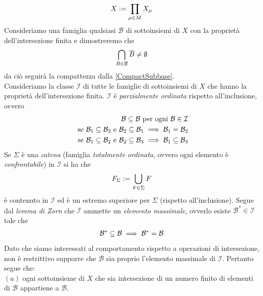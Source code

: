 \documentclass[oneside, 11pt]{amsbook}
\makeatletter
\newcommand{\0}{{(0)}}
\newcommand{\3}{{(3)}}
\theoremstyle{colonplain}
\theoremstyle{colondefinition}
\theoremstyle{colonremark}
\numberwithin{equation}{chapter}
\renewcommand{\proofname}{Dimostrazione}
\renewenvironment{proof}[1][\proofname]{\par
  \pushQED{\qed}%
  \normalfont \topsep6\p@\@plus6\p@\relax
  \trivlist
  \item[\hskip\labelsep\bfseries #1:]\ignorespaces
}{%
  \popQED\endtrivlist\@endpefalse
}
\makeatother
\begin{document}
\begin{proof}
\begin{align}
    X := \prod_{\mu \in M} X_\mu \notag
\end{align}
Consideriamo una famiglia qualsiasi $\mathcal{B}$ di sottoinsiemi di $X$ con la proprietà dell'intersezione finita e dimostreremo che
\begin{align}
    \bigcap_{B \in \mathcal{B}} \overline{B} \neq \emptyset \notag
\end{align}
da ciò seguirà la compattezza dalla \cref{CompactSubbase}. \\
Consideriamo la classe $\mathcal{I}$ di tutte le famiglie di sottoinsiemi di $X$ che hanno la proprietà dell'intersezione finita. $\mathcal{I}$ è \textit{parzialmente ordinata} rispetto all'inclusione, ovvero
\begin{align}
    \mathcal{B} \subseteq \mathcal{B} \text{ per ogni } \mathcal{B} \in \mathcal{I} \notag \\
    \text{ se } \mathcal{B}_1 \subseteq \mathcal{B}_2 \text{ e } \mathcal{B}_2 \subseteq \mathcal{B}_1 \implies \mathcal{B}_1 = \mathcal{B}_2 \notag \\
    \text{ se } \mathcal{B}_1 \subseteq \mathcal{B}_2 \text{ e } \mathcal{B}_2 \subseteq \mathcal{B}_3 \implies \mathcal{B}_1 \subseteq \mathcal{B}_3 \notag
\end{align}
Se $\Sigma$ è una \textit{catena} (famiglia \textit{totalmente ordinata}, ovvero ogni elemento è \textit{confrontabile}) in $\mathcal{I}$ si ha che
\begin{align}
    F_\Sigma := \bigcup_{F \in \Sigma} F \notag
\end{align}
è contenuto in $\mathcal{I}$ ed è un estremo superiore per $\Sigma$ (rispetto all'inclusione). Segue dal \textit{lemma di Zorn} che $\mathcal{I}$ ammette un \textit{elemento massimale}, ovverlo esiste $\mathcal{B}^* \in \mathcal{I}$ tale che
\begin{align}
    \mathcal{B}^* \subseteq \mathcal{B} \implies \mathcal{B}^* = \mathcal{B} \notag
\end{align}
Dato che siamo interessati al comportamento rispetto a operazioni di intersezione, non è restrittivo supporre che $\mathcal{B}$ sia proprio l'elemento massimale di $\mathcal{I}$. Pertanto segue che: \\

$(a)$ ogni sottoinsieme di $X$ che sia intersezione di un numero finito di elementi di $\mathcal{B}$ appartiene a $\mathcal{B}$.


\end{proof}
\end{document}
